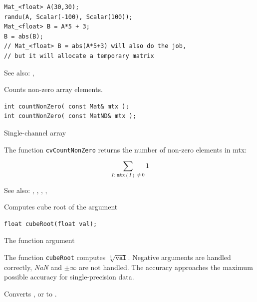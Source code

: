 \begin{lstlisting}
Mat_<float> A(30,30);
randu(A, Scalar(-100), Scalar(100));
Mat_<float> B = A*5 + 3;
B = abs(B);
// Mat_<float> B = abs(A*5+3) will also do the job,
// but it will allocate a temporary matrix
\end{lstlisting}

See also: , 

\label{countNonZero}
Counts non-zero array elements.

\begin{lstlisting}
int countNonZero( const Mat& mtx );
int countNonZero( const MatND& mtx );
\end{lstlisting}
\begin{description}
Single-channel array
\end{description}

The function \texttt{cvCountNonZero} returns the number of non-zero elements in mtx:

\[ \sum_{I:\;\texttt{mtx}(I)\ne0} 1 \]

See also: , , , , 

\label{cubeRoot}
Computes cube root of the argument

\begin{lstlisting}
float cubeRoot(float val);
\end{lstlisting}
\begin{description}
The function argument
\end{description}

The function \texttt{cubeRoot} computes $\sqrt[3]{\texttt{val}}$.
Negative arguments are handled correctly, \emph{NaN} and $\pm\infty$ are not handled.
The accuracy approaches the maximum possible accuracy for single-precision data.

\label{cvsrcToMat}
Converts ,  or  to .

